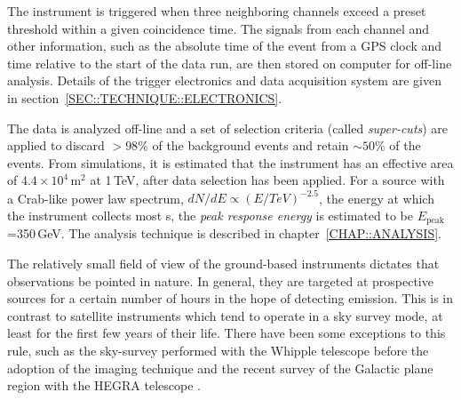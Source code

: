 The instrument is triggered when three neighboring channels exceed a
preset threshold within a given coincidence time. The signals from
each channel and other information, such as the absolute time of the
event from a GPS clock and time relative to the start of the data run,
are then stored on computer for off-line analysis. Details of the
trigger electronics and data acquisition system are given in
section~\ref{SEC::TECHNIQUE::ELECTRONICS}.

The data is analyzed off-line and a set of selection criteria (called
\textit{super-cuts}) are applied to discard $>98$\% of the background
events and retain $\sim50$\% of the \Gray events. From simulations, it
is estimated that the instrument has an effective area of
$4.4\times10^4$\,m$^2$ at 1\,TeV, after data selection has been
applied. For a source with a Crab-like power law spectrum,
$dN/dE\propto(E/TeV)^{-2.5}$, the energy at which the instrument
collects most {\Grayc}s, the \textit{peak response energy} is estimated
to be $E_\mathrm{peak}$=350\,GeV. The analysis technique is described
in chapter~\ref{CHAP::ANALYSIS}.

The relatively small field of view of the ground-based \Cerenkov
instruments dictates that observations be pointed in nature. In
general, they are targeted at prospective sources for a certain number
of hours in the hope of detecting emission. This is in contrast to
satellite instruments which tend to operate in a sky survey mode, at
least for the first few years of their life. There have been some
exceptions to this rule, such as the sky-survey performed with the
Whipple telescope before the adoption of the imaging technique
\citep{REF::WEEKES::ICRC1979} and the recent survey of the Galactic plane
region with the HEGRA telescope \citep{REF::AHARONIAN::AA2002}. 

